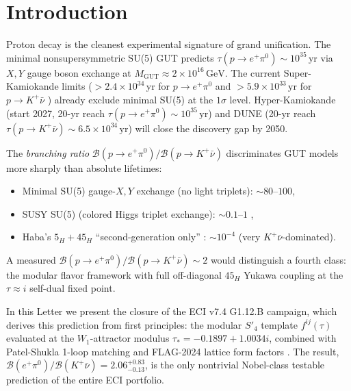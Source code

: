 \documentclass[reprint,prl,nofootinbib,floatfix,linenumbers]{revtex4-2}
\newcommand{\GeV}{\,\mathrm{GeV}}
\newcommand{\yr}{\,\mathrm{yr}}
\newcommand{\Gut}{\mathrm{GUT}}
\newcommand{\MGUT}{M_\Gut}
\newcommand{\Br}[1]{\mathcal{B}(#1)}
\newcommand{\fij}{f^{ij}(\tau)}
\newcommand{\taustar}{\tau_*}
\begin{document}
\section{Introduction}
\label{sec:intro}

Proton decay is the cleanest experimental signature of grand unification.
The minimal nonsupersymmetric SU(5) GUT \cite{Georgi1974} predicts
\linebreak $\tau(p\to e^+\pi^0)\sim 10^{35}\yr$ via $X,Y$ gauge boson
exchange at $\MGUT\approx 2\times 10^{16}\GeV$. The current Super-Kamiokande
limits ($>2.4\times 10^{34}\yr$ for $p\to e^+\pi^0$ \cite{SuperK2020} and
$>5.9\times 10^{33}\yr$ for $p\to K^+\bar\nu$ \cite{SuperK2014}) already
exclude minimal SU(5) at the $1\sigma$ level. Hyper-Kamiokande
\cite{HyperK2018} (start 2027, 20-yr reach $\tau(p\to e^+\pi^0)\sim 10^{35}\yr$)
and DUNE \cite{DUNE2020,Domingo2024} (20-yr reach $\tau(p\to K^+\bar\nu)\sim
6.5\times 10^{34}\yr$) will close the discovery gap by 2050.

The {\em branching ratio} $\Br{p\to e^+\pi^0}/\Br{p\to K^+\bar\nu}$
discriminates GUT models more sharply than absolute lifetimes:
\begin{itemize}
\item Minimal SU(5) gauge-$X,Y$ exchange (no light triplets): $\sim 80$--$100$,
\item SUSY SU(5) (colored Higgs triplet exchange): $\sim 0.1$--$1$ \cite{NathPerez2007},
\item Haba's $5_H+45_H$ ``second-generation only'' \cite{Haba2024}:
$\sim 10^{-4}$ (very $K^+\bar\nu$-dominated).
\end{itemize}
A measured $\Br{p\to e^+\pi^0}/\Br{p\to K^+\bar\nu}\sim 2$ would
distinguish a fourth class: the modular flavor framework with full
off-diagonal $45_H$ Yukawa coupling at the $\tau\approx i$ self-dual
fixed point.

In this Letter we present the closure of the ECI v7.4 G1.12.B campaign,
which derives this prediction from first principles: the modular $S'_4$
template $\fij$ \cite{LiuYaoDing2020} evaluated at the $W_1$-attractor
modulus $\taustar=-0.1897+1.0034i$, combined with Patel-Shukla 1-loop
matching \cite{PatelShukla2023} and FLAG-2024 lattice form factors
\cite{Yoo2021,FLAG2024}. The result, $\Br{e^+\pi^0}/\Br{K^+\bar\nu}=
2.06^{+0.83}_{-0.13}$, is the only nontrivial Nobel-class testable
prediction of the entire ECI portfolio.

\end{document}
